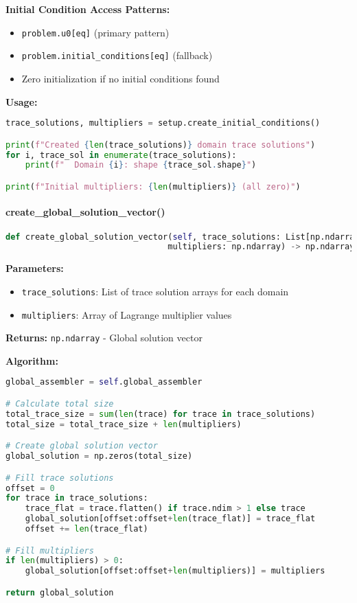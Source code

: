 \textbf{Initial Condition Access Patterns:}
\begin{itemize}
    \item \texttt{problem.u0[eq]} (primary pattern)
    \item \texttt{problem.initial\_conditions[eq]} (fallback)
    \item Zero initialization if no initial conditions found
\end{itemize}

\textbf{Usage:}
\begin{lstlisting}[language=Python, caption=Initial Conditions Usage]
trace_solutions, multipliers = setup.create_initial_conditions()

print(f"Created {len(trace_solutions)} domain trace solutions")
for i, trace_sol in enumerate(trace_solutions):
    print(f"  Domain {i}: shape {trace_sol.shape}")

print(f"Initial multipliers: {len(multipliers)} (all zero)")
\end{lstlisting}

\paragraph{create\_global\_solution\_vector()}
\begin{lstlisting}[language=Python, caption=Create Global Solution Vector Method]
def create_global_solution_vector(self, trace_solutions: List[np.ndarray], 
                                 multipliers: np.ndarray) -> np.ndarray
\end{lstlisting}

\textbf{Parameters:}
\begin{itemize}
    \item \texttt{trace\_solutions}: List of trace solution arrays for each domain
    \item \texttt{multipliers}: Array of Lagrange multiplier values
\end{itemize}

\textbf{Returns:} \texttt{np.ndarray} - Global solution vector

\textbf{Algorithm:}
\begin{lstlisting}[language=Python, caption=Global Vector Assembly Algorithm]
global_assembler = self.global_assembler

# Calculate total size
total_trace_size = sum(len(trace) for trace in trace_solutions)
total_size = total_trace_size + len(multipliers)

# Create global solution vector
global_solution = np.zeros(total_size)

# Fill trace solutions
offset = 0
for trace in trace_solutions:
    trace_flat = trace.flatten() if trace.ndim > 1 else trace
    global_solution[offset:offset+len(trace_flat)] = trace_flat
    offset += len(trace_flat)

# Fill multipliers
if len(multipliers) > 0:
    global_solution[offset:offset+len(multipliers)] = multipliers

return global_solution
\end{lstlisting}

